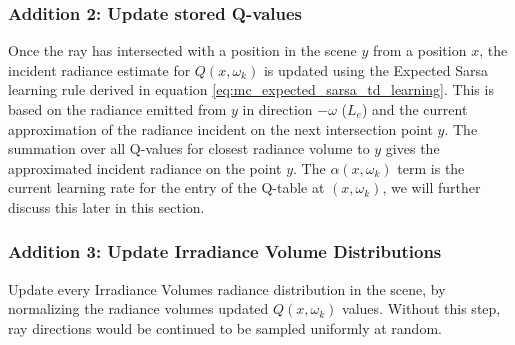 \documentclass[../dissertation.tex]{subfiles}
\begin{document}
\subsubsection*{Addition 2: Update stored Q-values}
Once the ray has intersected with a position in the scene $y$ from a position $x$, the incident radiance estimate  for $Q(x, \omega_k)$ is updated using the Expected Sarsa learning rule derived in equation \ref{eq:mc_expected_sarsa_td_learning}. This is based on the radiance emitted from $y$ in direction $-\omega$ ($L_e$) and the current approximation of the radiance incident on the next intersection point $y$. The summation over all Q-values for closest radiance volume to $y$ gives the approximated incident radiance on the point $y$. The $\alpha(x, \omega_k)$ term is the current learning rate for the entry of the Q-table at $(x, \omega_k)$, we will further discuss this later in this section.

\subsubsection*{Addition 3: Update Irradiance Volume Distributions}
Update every Irradiance Volumes radiance distribution in the scene, by normalizing the radiance volumes updated $Q(x, \omega_k)$ values.  Without this step, ray directions would be continued to be sampled uniformly at random.
\end{document}
